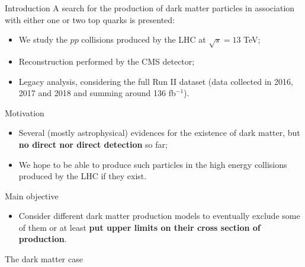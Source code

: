 \documentclass[8pt]{beamer}
\begin{document}
\begin{frame}{Introduction}
\justifying
A search for the \alert{production of dark matter particles in association with either one or two top quarks} is presented:

\vspace{-5pt}
\begin{itemize}
\justifying
\item We study the $pp$ collisions produced by the LHC at $\sqrt{s} = 13$ TeV;
\item Reconstruction performed by the CMS detector;
\item Legacy analysis, considering the full Run II dataset (data collected in 2016, 2017 and 2018 and summing around 136 fb$^{-1}$).
\end{itemize} \vfill

\begin{block}{\centering Motivation}\end{block}
\vspace{-5pt}
\begin{itemize}
\justifying
\item Several (mostly astrophysical) evidences for the existence of dark matter, but \textbf{no direct nor direct detection} so far;
\item We hope to be able to produce such particles in the high energy collisions produced by the LHC if they exist.
\end{itemize} \vfill

\begin{block}{ \centering Main objective}\end{block}
\vspace{-5pt}
\begin{itemize}
\justifying
\item Consider different dark matter production models to eventually exclude some of them or at least \textbf{put upper limits on their cross section of production}.
\end{itemize} \vfill
\end{frame}








\begin{frame}[standout]
The dark matter case
\end{frame}
\end{document}
